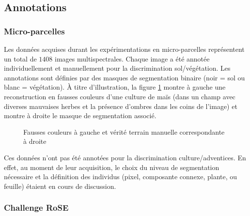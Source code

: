 \documentclass[../thesis.tex]{subfiles}
\begin{document}
    
    \newpage
    \subsection{Annotations}
    
    \subsubsection{Micro-parcelles}
    
    Les données acquises durant les expérimentations en micro-parcelles représentent un total de $1408$ images multispectrales. Chaque image a été annotée individuellement et manuellement pour la discrimination sol/végétation. Les annotations sont définies par des masques de segmentation binaire (noir = sol ou blanc = végétation).
    À titre d'illustration, la figure \ref{fig:04-mat-culture-adventice} montre à gauche une reconstruction en fausses couleurs d'une culture de maïs (dans un champ avec diverses mauvaises herbes et la présence d'ombres dans les coins de l'image) et montre à droite le masque de segmentation associé.
    
    \begin{figure}[H]
        \centering
         \hfill
        \caption{Fausses couleurs à gauche et vérité terrain manuelle correspondante à droite}
        \label{fig:04-mat-culture-adventice}
    \end{figure}
    
    Ces données n'ont pas été annotées pour la discrimination culture/adventices. En effet, au moment de leur acquisition, le choix du niveau de segmentation nécessaire et la définition des individus (pixel, composante connexe, plante, ou feuille) étaient en cours de discussion.
    
    \subsubsection{Challenge RoSE}
    
\end{document}

